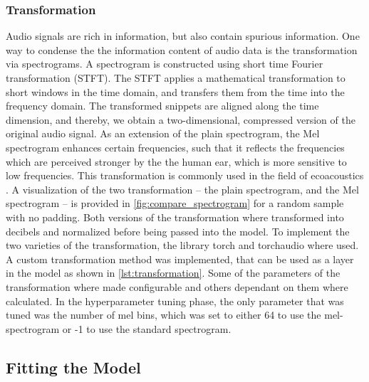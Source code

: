 \subsubsection{Transformation}%
Audio signals are rich in information, but also contain spurious information.
One way to condense the the information content of audio data is the transformation via spectrograms.
A spectrogram is constructed using short time Fourier transformation (STFT).
The STFT applies a mathematical transformation to short windows in the time domain, and transfers them from the time into the frequency domain.
The transformed snippets are aligned along the time dimension, and thereby, we obtain a two-dimensional, compressed version of the original audio signal.
As an extension of the plain spectrogram, the Mel spectrogram enhances certain frequencies, 
such that it reflects the frequencies which are perceived stronger by the the human ear, which is more sensitive to low frequencies.
This transformation is commonly used in the field of ecoacoustics \autocite[7]{stowellComputationalBioacousticsDeep2022}.
A visualization of the two transformation -- the plain spectrogram, and the Mel spectrogram -- is provided in \autoref{fig:compare_spectrogram}
for a random sample with no padding. Both versions of the transformation where transformed into decibels and normalized before 
being passed into the model.
To implement the two varieties of the transformation, the library torch and torchaudio where used.
A custom transformation method was implemented, that can be used as a layer in the model as shown in 
\autoref{lst:transformation}. Some of the parameters of the transformation where made configurable
and others dependant on them where calculated. In the hyperparameter tuning phase, the only parameter
that was tuned was the number of mel bins, which was set to either 64 to use the mel-spectrogram or -1
to use the standard spectrogram.





\subsection{Fitting the Model}%

